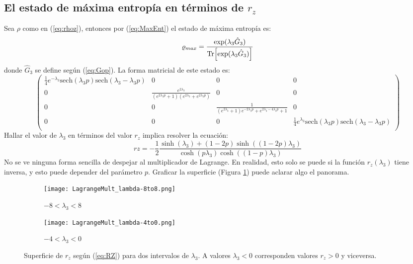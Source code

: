 \subsection{El estado de máxima entropía en términos de $r_{z}$}
Sea $\rho$ como en (\ref{eq:rhoz}), entonces por (\ref{eq:MaxEnt}) el estado de máxima entropía es:
\begin{equation}\label{eq:MaxEntZ}
\varrho_{max}=\frac{\text{exp}(\lambda_{3}\hat{G}_{3})}{\Tr[\text{exp}(\lambda_{3}\hat{G}_{3})]}
\end{equation}
donde $\hat{G}_{3}$ se define según (\ref{eq:Gop}). La forma matricial de este estado es:
\begin{equation*}
\left(
\begin{array}{cccc}
 \frac{1}{4} e^{-\lambda_{3}} \text{sech}(\lambda_{3} p)
   \text{sech}(\lambda_{3}-\lambda_{3} p) & 0 & 0 & 0 \\
 0 & \frac{e^{2 \lambda_{3}}}{\left(e^{2 \lambda_{3}
   p}+1\right) \left(e^{2 \lambda_{3}}+e^{2 \lambda_{3}
   p}\right)} & 0 & 0 \\
 0 & 0 & \frac{1}{\left(e^{2 \lambda_{3}}+1\right) e^{-2
   \lambda_{3} p}+e^{2 \lambda_{3}-4 \lambda_{3}
   p}+1} & 0 \\
 0 & 0 & 0 & \frac{1}{4} e^{\lambda_{3}}
   \text{sech}(\lambda_{3} p) \text{sech}(\lambda_{3}-\lambda_{3} p) \\
\end{array}
\right)
\end{equation*}
Hallar el valor de $\lambda_{
3}$ en términos del valor $r_{z}$ implica resolver la ecuación:
\begin{equation}\label{eq:RZ}
rz=-\frac{1}{2}\frac{\sinh(\lambda_{3})+(1-2p)\sinh((1-2p)\lambda_{3})}{\cosh(p\lambda_{3})\cosh((1-p)\lambda_{3})}
\end{equation}
No se ve ninguna forma sencilla de despejar al multiplicador de Lagrange. En realidad, esto solo se puede si la función $r_{z}(\lambda_{3})$ tiene inversa, y esto puede depender del parámetro $p$. Graficar la superficie (Figura \ref{fig:rzsurf}) puede aclarar algo el panorama.
\begin{figure}[h!]
\centering
\begin{subfigure}{0.475\textwidth}
  \centering
  \texttt{[image: LagrangeMult\_lambda-8to8.png]}
  \caption{$-8<\lambda_{3}<8$}
\end{subfigure}%
\begin{subfigure}{0.475\textwidth}
  \centering
  \texttt{[image: LagrangeMult\_lambda-4to0.png]}
  \caption{$-4<\lambda_{3}<0$}
\end{subfigure}
\caption{Superficie de $r_{z}$ según (\ref{eq:RZ}) para dos intervalos de $\lambda_{3}$. A valores $\lambda_{3}<0$ corresponden valores $r_{z}>0$ y viceversa.}
\label{fig:rzsurf}
\end{figure}

